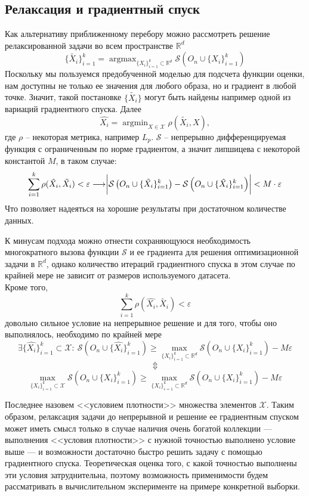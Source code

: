 \documentclass[a4paper,14pt]{extarticle}
\DeclareMathOperator*{\argmax}{argmax}
\DeclareMathOperator*{\argmin}{argmin}
\begin{document}
			\subsection{Релаксация и градиентный спуск}\label{continuous}
			Как альтернативу приближенному перебору можно рассмотреть решение релаксированной задачи во всем пространстве $\mathbb{R}^d$
			$$\{\tilde{X_i}\}_{i=1}^k= \argmax_{\{X_i\}_{i=1}^k\subset\mathbb{R}^d} \mathcal{S}\left(O_n\cup\{X_i\}_{i=1}^k\right)$$
			Поскольку мы пользуемся предобученной моделью для подсчета функции оценки, нам доступны не только ее значения для любого образа, но и градиент в любой точке. Значит, такой постановке $\{\tilde{X_i}\}$ могут быть найдены например одной из вариаций градиентного спуска.
			Далее 
			$$\hat{X_i} =  \argmin_{X\in\mathcal{X}} \rho(\tilde{X_i}, X),$$
			где $\rho$ -- некоторая метрика, например $L_p$. 
			$\mathcal{S}$ -- непрерывно дифференцируемая функция с ограниченным по норме градиентом, а значит липшицева с некоторой константой $M$, в таком случае:
			$$\sum_{i=1}^k\rho(\hat{X_i}, \tilde{X_i}) < \varepsilon\longrightarrow \biggr{|}\mathcal{S}\left(O_n\cup\{\tilde{X_i}\}_{i=1}^k\right) - \mathcal{S}\left(O_n\cup\{\hat{X_i}\}_{i=1}^k\right)\biggr{|} < M\cdot\varepsilon$$
			Что позволяет надеяться на хорошие результаты при достаточном количестве данных.
			
			К минусам подхода можно отнести сохраняющуюся необходимость многократного вызова функции $\mathcal{S}$ и ее градиента для решения оптимизационной задачи в $\mathbb{R}^d$, однако количество итераций градиентного спуска в этом случае по крайней мере не зависит от размеров используемого датасета.\\
			Кроме того, 
			$$\sum_{i=1}^k\rho(\hat{X_i}, \tilde{X_i}) < \varepsilon$$
			довольно сильное условие на непрерывное решение и для того, чтобы оно выполнялось, необходимо по крайней мере
			$$\exists \{\hat{X_i}\}_{i=1}^k\subset\mathcal{X}:~ \mathcal{S}\left(O_n\cup\{\hat{X_i}\}_{i=1}^k\right) \geqslant \max_{\{X_i\}_{i=1}^k\subset\mathbb{R}^d} \mathcal{S}\left(O_n\cup\{X_i\}_{i=1}^k\right) - M\varepsilon$$
			$$\Updownarrow$$
			$$\max_{\{X_i\}_{i=1}^k\subset\mathcal{X}} \mathcal{S}\left(O_n\cup\{X_i\}_{i=1}^k\right) \geqslant \max_{\{X_i\}_{i=1}^k\subset\mathbb{R}^d} \mathcal{S}\left(O_n\cup\{X_i\}_{i=1}^k\right) - M\varepsilon$$
			
			Последнее назовем <<условием плотности>> множества элементов $\mathcal{X}$. Таким образом, релаксация задачи до непрерывной и решение ее градиентным спуском может иметь смысл только в случае наличия очень богатой коллекции --- выполнения <<условия плотности>> с нужной точностью выполнено условие выше --- и возможности достаточно быстро решить задачу с помощью градиентного спуска. Теоретическая оценка того, с какой точностью выполнены эти условия затруднительна, поэтому возможность применимости будем рассматривать в вычислительном эксперименте на примере конкретной выборки.
						
\end{document}

